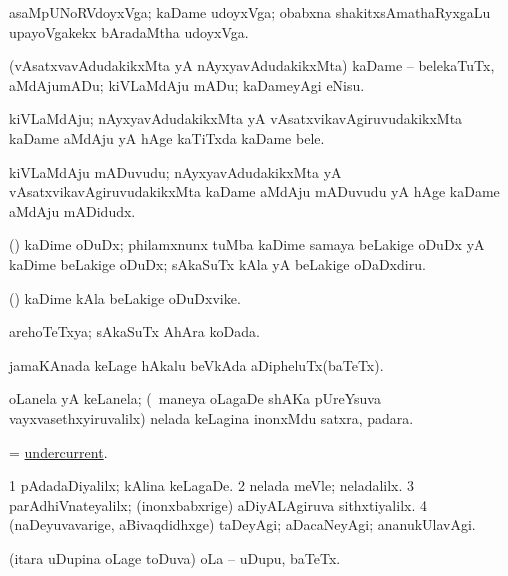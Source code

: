 \bentry
{} 
\gl{\nA}
\bmng
 asaMpUNoRVdoyxVga; kaDame udoyxVga; obabxna shakitxsAmathaRyxgaLu upayoVgakekx bAradaMtha udoyxVga. 
\emng
\eentry

\bentry
{} 
\gl{\sakirx}
\expl{}
\bmng
 (vAsatxvavAdudakikxMta yA nAyxyavAdudakikxMta) kaDame -- belekaTuTx, aMdAjumADu; kiVLaMdAju mADu; kaDameyAgi eNisu. 
\emng
\eentry

\bentry
{} 
\gl{\nA}
\expl{}
\bmng
 kiVLaMdAju; nAyxyavAdudakikxMta yA vAsatxvikavAgiruvudakikxMta kaDame aMdAju yA hAge kaTiTxda kaDame bele. 
\emng
\eentry

\bentry
{} 
\gl{\nA}
\expl{}
\bmng
 kiVLaMdAju mADuvudu; nAyxyavAdudakikxMta yA vAsatxvikavAgiruvudakikxMta kaDame aMdAju mADuvudu yA hAge kaDame aMdAju mADidudx. 
\emng
\eentry

\bentry
{} 
\gl{\sakirx}
\expl{}
\bmng
 (\CA) kaDime oDuDx; philamxnunx tuMba kaDime samaya beLakige oDuDx yA kaDime beLakige oDuDx; sAkaSuTx kAla yA beLakige oDaDxdiru. 
\emng
\eentry

\bentry
{} 
\gl{\nA}
\expl{}
\bmng
 (\CA) kaDime kAla beLakige oDuDxvike. 
\emng
\eentry

\bentry
{} 
\gl{\gu}
\expl{}
\bmng
 arehoTeTxya; sAkaSuTx AhAra koDada. 
\emng
\eentry

\bentry
{} 
\gl{\nA}
\expl{}
\bmng
 jamaKAnada keLage hAkalu beVkAda aDipheluTx(baTeTx). 
\emng
\eentry

\bentry
{} 
\gl{\nA}
\expl{}
\bmng
 oLanela yA keLanela; (\kanmu\ maneya oLagaDe shAKa pUreYsuva vayxvasethxyiruvalilx) nelada keLagina inonxMdu satxra, padara. 
\emng
\eentry

\bentry
{} 
\gl{\nA}
\expl{}
\bmng
 = \hyperlink{undercurrent}{undercurrent}. 
\emng
\eentry

\bentry
{} 
\gl{\kirxvi}
\expl{}
\bmng
\bnum
\num{1} pAdadaDiyalilx; kAlina keLagaDe. 
\num{2} nelada meVle; neladalilx. 
\num{3} parAdhiVnateyalilx; (inonxbabxrige) aDiyALAgiruva sithxtiyalilx. 
\num{4} (naDeyuvavarige, aBivaqdidhxge) taDeyAgi; aDacaNeyAgi; ananukUlavAgi. 
\enum
\emng
\eentry

\bentry
{} 
\gl{\nA}
\expl{}
\bmng
 (itara uDupina oLage toDuva) oLa -- uDupu, baTeTx. 
\emng
\eentry

